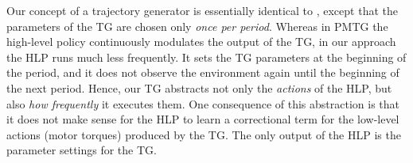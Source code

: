 \documentclass[a4paper]{article}
\begin{document}
Our concept of a trajectory generator is essentially identical to \citet{iscen2018pmtg}, except that the parameters of the TG are chosen only \emph{once per period}.
Whereas in PMTG the high-level policy continuously modulates the output of the TG, in our approach the HLP runs much less frequently.
It sets the TG parameters at the beginning of the period, and it does not observe the environment again until the beginning of the next period.
Hence, our TG abstracts not only the \emph{actions} of the HLP, but also \emph{how frequently} it executes them.
One consequence of this abstraction is that it does not make sense for the HLP to learn a correctional term for the low-level actions (motor torques) produced by the TG.
The only output of the HLP is the parameter settings for the TG.
\end{document}
